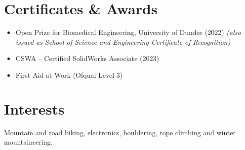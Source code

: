 \documentclass[a4paper,11pt]{article}
\begin{document}

\section*{Certificates \& Awards}
\begin{itemize}
    \item Open Prize for Biomedical Engineering, University of Dundee (2022) \textit{(also issued as School of Science and Engineering Certificate of Recognition)}
    \item CSWA – Certified SolidWorks Associate (2023)
    \item First Aid at Work (Ofqual Level 3)
\end{itemize}


\section*{Interests}
Mountain and road biking, electronics, bouldering, rope climbing and winter mountaineering.
\end{document}
